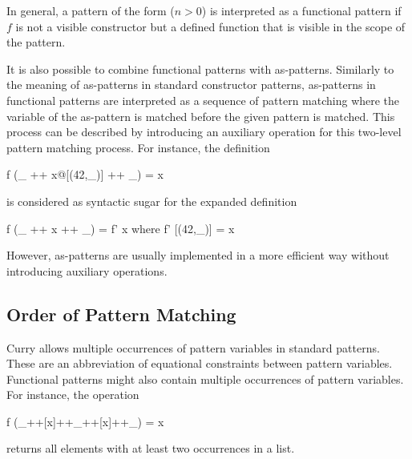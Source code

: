 In general, a pattern of the form  ($n>0$)
is interpreted as a functional pattern if $f$ is not a visible constructor
but a defined function that is visible in the scope of the pattern.

It is also possible to combine functional patterns with
as-patterns.
Similarly to the meaning of as-patterns
in standard constructor patterns,
as-patterns in functional patterns are interpreted
as a sequence of pattern matching where the variable of the as-pattern
is matched before the given pattern is matched.
This process can be described by introducing an auxiliary operation
for this two-level pattern matching process.
For instance, the definition
\begin{curry}
f (_ ++ x@[(42,_)] ++ _) = x
\end{curry}
is considered as syntactic sugar for the expanded definition
\begin{curry}
f (_ ++ x ++ _) = f' x
 where
  f' [(42,_)] = x
\end{curry}
However, as-patterns are usually implemented
in a more efficient way without introducing auxiliary operations.

\subsection{Order of Pattern Matching}

Curry allows multiple occurrences of pattern variables
in standard patterns. These are an abbreviation of equational constraints
between pattern variables.
Functional patterns might also contain multiple occurrences of
pattern variables.
For instance, the operation
\begin{curry}
f (_++[x]++_++[x]++_) = x
\end{curry}
returns all elements with at least two occurrences in a list.

